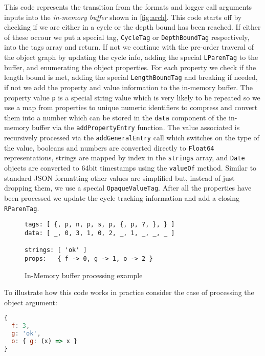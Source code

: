 This code represents the transition from the formats and logger call arguments 
inputs into the \emph{in-memory buffer} shown in \autoref{fig:arch}. This code 
starts off by checking if we are either in a cycle or the depth bound has been 
reached. If either of these occour we put a special tag, \texttt{CycleTag} or 
\texttt{DepthBoundTag} respectively, into the tags array and return. If not we 
continue with the pre-order traveral of the object graph by updating the cycle 
info, adding the special \texttt{LParenTag} to the buffer, and enumerating the 
object properties. For each property we check if the length bound is met, adding 
the special \texttt{LengthBoundTag} and breaking if needed, if not we add the 
property and value information to the in-memory buffer. The property value \texttt{p} 
is a special string value which is very likely to be repeated so we use a map 
from properties to unique numeric identifiers to compress and convert them into 
a number which can be stored in the \texttt{data} component of the in-memory buffer 
via the \texttt{addPropertyEntry} function. The value associated is recursively 
processed via the \texttt{addGeneralEntry} call which switches on the type of the 
value, booleans and numbers are converted directly to \texttt{Float64} representations, 
strings are mapped by index in the \texttt{strings} array, and \texttt{Date} objects 
are converted to $64$bit timestamps using the \texttt{valueOf} method. Similar to 
standard JSON formatting other values are simplified but, instead of just dropping 
them, we use a special \texttt{OpaqueValueTag}. After all the properties have 
been processed we update the cycle tracking information and add a closing 
\texttt{RParenTag}.

\begin{figure}
    \centering
\begin{lstlisting}[basicstyle=\small,numbers=none]
tags: [ {, p, n, p, s, p, {, p, ?, }, } ]
data: [ _, 0, 3, 1, 0, 2, _, 1, _, _, _ ]

strings: [ 'ok' ]
props:   { f -> 0, g -> 1, o -> 2 }

\end{lstlisting}
    \caption{In-Memory buffer processing example}
    \label{fig:inmemory}
\end{figure}

To illustrate how this code works in practice consider the case of processing the 
object argument:

\begin{lstlisting}[language=JavaScript,basicstyle=\scriptsize,numbers=none]
{
  f: 3,
  g: 'ok',
  o: { g: (x) => x }
}
\end{lstlisting}

